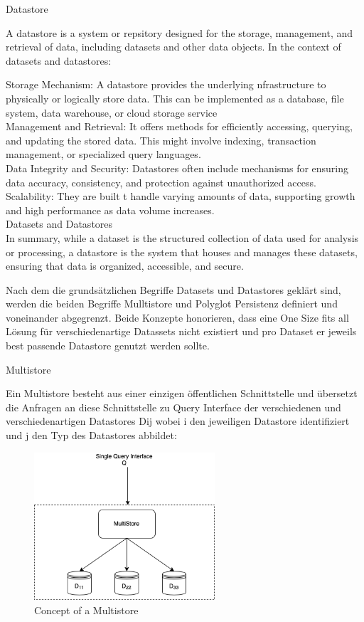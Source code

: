 Datastore

A datastore is a system or repsitory designed for the storage, management, and retrieval of data, including datasets and other data objects. In the context of datasets and datastores:

Storage Mechanism: A datastore provides the underlying nfrastructure to physically or logically store data. This can be implemented as a database, file system, data warehouse, or cloud storage service\newline
\\
    Management and Retrieval: It offers methods for efficiently accessing, querying, and updating the stored data. This might involve indexing, transaction management, or specialized query languages.
\\
    Data Integrity and Security: Datastores often include mechanisms for ensuring data accuracy, consistency, and protection against unauthorized access.
\\
    Scalability: They are built t handle varying amounts of data, supporting growth and high performance as data volume increases.
\\

Datasets and Datastores\\

In summary, while a dataset is the structured collection of data used for analysis or processing, 
a datastore is the system that houses and manages these datasets, ensuring that data is organized, accessible, and secure.

Nach dem die grundsätzlichen Begriffe Datasets und Datastores geklärt sind, werden die beiden Begriffe Mulltistore und 
Polyglot Persistenz definiert und voneinander abgegrenzt. Beide Konzepte honorieren, dass eine One Size fits all Lösung für 
verschiedenartige Datassets nicht existiert und pro Dataset er jeweils best passende Datastore genutzt werden sollte.


Multistore

Ein Multistore besteht aus einer einzigen öffentlichen Schnittstelle und übersetzt die Anfragen an diese 
Schnittstelle zu Query Interface der verschiedenen und verschiedenartigen Datastores Dij wobei i den jeweiligen Datastore
identifiziert und j den Typ des Datastores abbildet:

\begin{figure}[htbp]
    \centering
    \includegraphics[width=0.60\textwidth]{gfx/examples/master_thesis-multistore.png}
    \caption{Concept of a Multistore}
    \label{fig:multistore}
\end{figure} 


